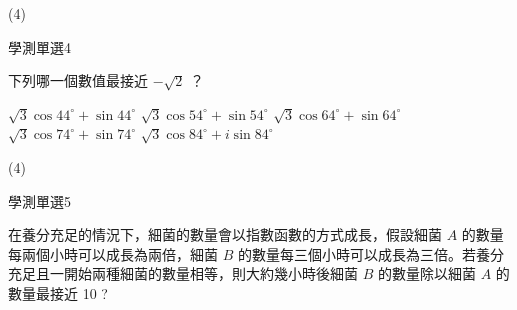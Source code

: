 \begin{QUESTIONS}
\begin{QUESTION}
        \begin{QANS}
            (4)
        \end{QANS}
        \begin{QSOLLIST}
        \end{QSOLLIST}
        \begin{QEMPTYSPACE}
        \end{QEMPTYSPACE}
    \end{QUESTION}
    \begin{QUESTION}
        \begin{ExamInfo}{95}{學測}{單選}{4}
        \end{ExamInfo}
        \begin{ExamAnsRateInfo}{34}{67}{23}{12}
        \end{ExamAnsRateInfo}
        \begin{QBODY}
            下列哪一個數值最接近 $-\sqrt{2}$ ？ 
			\begin{QOPS} 
				\QOP $\sqrt{3}\cos{44^\circ}+ \sin{44^\circ}$ 
				\QOP $\sqrt{3}\cos{54^\circ}+ \sin{54^\circ}$ 
				\QOP $\sqrt{3}\cos{64^\circ} +\sin{64^\circ}$
				\QOP $\sqrt{3}\cos{74^\circ}+\sin{74^\circ}$
				\QOP $\sqrt{3}\cos{84^\circ}+i\sin{84^\circ}$
			\end{QOPS}
        \end{QBODY}
        \begin{QFROMS}
        \end{QFROMS}
        \begin{QTAGS}\end{QTAGS}
        \begin{QANS}
            (4)
        \end{QANS}
        \begin{QSOLLIST}
        \end{QSOLLIST}
        \begin{QEMPTYSPACE}
        \end{QEMPTYSPACE}
    \end{QUESTION}
    \begin{QUESTION}
        \begin{ExamInfo}{95}{學測}{單選}{5}
        \end{ExamInfo}
        \begin{ExamAnsRateInfo}{24}{50}{15}{7}
        \end{ExamAnsRateInfo}
        \begin{QBODY}
            在養分充足的情況下，細菌的數量會以指數函數的方式成長，假設細菌 $A$ 的數量每兩個小時可以成長為兩倍，細菌 $B$ 的數量每三個小時可以成長為三倍。若養分充足且一開始兩種細菌的數量相等，則大約幾小時後細菌 $B$ 的數量除以細菌 $A$ 的數量最接近 10 ? 

\end{QBODY}
\end{QUESTION}
\end{QUESTIONS}
